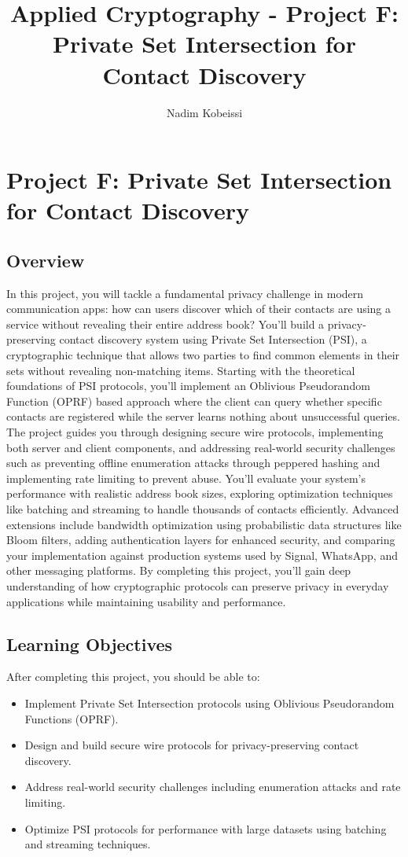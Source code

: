 \documentclass[10pt,a4paper,american]{exam}
\title{Applied Cryptography - Project F: Private Set Intersection for Contact Discovery}
\author{Nadim Kobeissi}
\begin{document}
\classhandoutheader
\section*{Project F: Private Set Intersection for Contact Discovery}

\subsection*{Overview}
In this project, you will tackle a fundamental privacy challenge in modern communication apps: how can users discover which of their contacts are using a service without revealing their entire address book? You'll build a privacy-preserving contact discovery system using Private Set Intersection (PSI), a cryptographic technique that allows two parties to find common elements in their sets without revealing non-matching items. Starting with the theoretical foundations of PSI protocols, you'll implement an Oblivious Pseudorandom Function (OPRF) based approach where the client can query whether specific contacts are registered while the server learns nothing about unsuccessful queries. The project guides you through designing secure wire protocols, implementing both server and client components, and addressing real-world security challenges such as preventing offline enumeration attacks through peppered hashing and implementing rate limiting to prevent abuse. You'll evaluate your system's performance with realistic address book sizes, exploring optimization techniques like batching and streaming to handle thousands of contacts efficiently. Advanced extensions include bandwidth optimization using probabilistic data structures like Bloom filters, adding authentication layers for enhanced security, and comparing your implementation against production systems used by Signal, WhatsApp, and other messaging platforms. By completing this project, you'll gain deep understanding of how cryptographic protocols can preserve privacy in everyday applications while maintaining usability and performance.

\subsection*{Learning Objectives}
After completing this project, you should be able to:
\begin{itemize}
	\item Implement Private Set Intersection protocols using Oblivious Pseudorandom Functions (OPRF).
	\item Design and build secure wire protocols for privacy-preserving contact discovery.
	\item Address real-world security challenges including enumeration attacks and rate limiting.
	\item Optimize PSI protocols for performance with large datasets using batching and streaming techniques.
\end{itemize}
\end{document}
